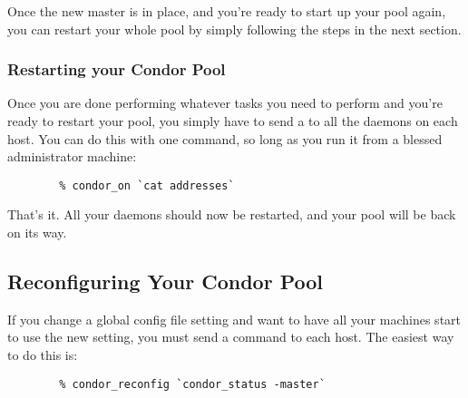 Once the new master is in place, and you're ready to start up your
pool again, you can restart your whole pool by simply following the
steps in the next section.

\subsubsection{\label{sec:Pool-Restart}Restarting your Condor Pool}

Once you are done performing whatever tasks you need to perform and
you're ready to restart your pool, you simply have to send a
 to all the  daemons on each host.
You can do this with one command, so long as you run it from a blessed
administrator machine:
\begin{verbatim}
        % condor_on `cat addresses`
\end{verbatim}
That's it.  All your daemons should now be restarted, and your pool
will be back on its way.

\subsection{\label{sec:Reconfigure-Pool}Reconfiguring Your Condor Pool}

If you change a global config file setting and want to have all your
machines start to use the new setting, you must send a
 command to each host.  The easiest way to do this
is: 
\begin{verbatim}
        % condor_reconfig `condor_status -master`
\end{verbatim}

